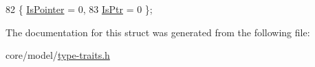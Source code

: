 \begin{DoxyCode}
82             \{ \hyperlink{structTypeTraits_1_1PointerTraits_aa347275cb9f15c69a7d822f06fc1ff18a9da4883944a6a2b7d823915154aead18}{IsPointer} = 0,          
83                           \hyperlink{structTypeTraits_1_1PointerTraits_aa347275cb9f15c69a7d822f06fc1ff18acc0995ad6c0463570690189171f3d619}{IsPtr} = 0               \};
\end{DoxyCode}


The documentation for this struct was generated from the following file\+:\begin{DoxyCompactItemize}
\item 
core/model/\hyperlink{type-traits_8h}{type-\/traits.\+h}\end{DoxyCompactItemize}
